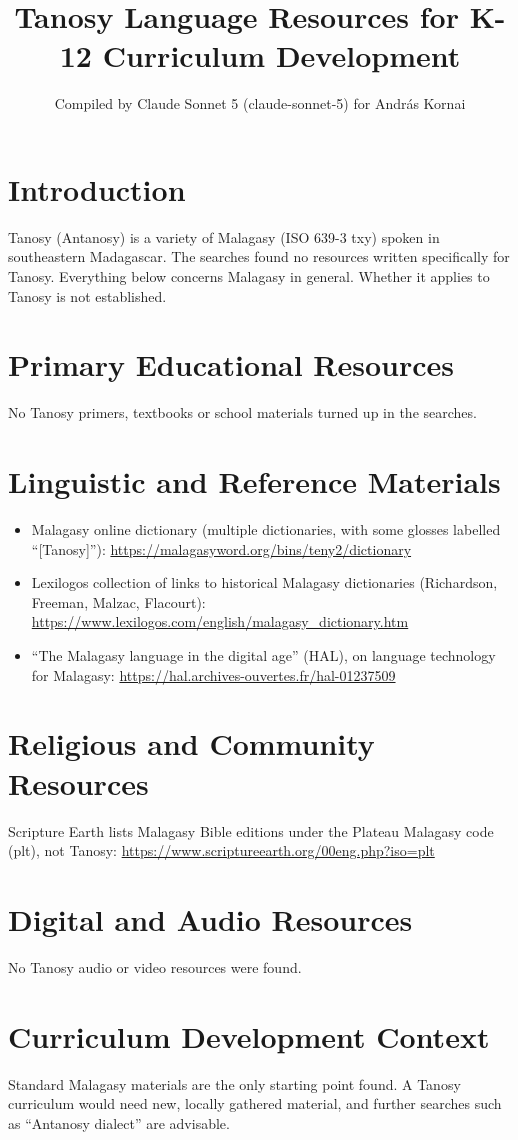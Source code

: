 \documentclass[12pt]{article}
\title{Tanosy Language Resources for K-12 Curriculum Development}
\author{Compiled by Claude Sonnet 5 (claude-sonnet-5) for Andr\'as Kornai}
\date{}
\begin{document}
\maketitle

\section{Introduction}
Tanosy (Antanosy) is a variety of Malagasy (ISO 639-3 txy) spoken in southeastern Madagascar. The searches found no resources written specifically for Tanosy. Everything below concerns Malagasy in general. Whether it applies to Tanosy is not established.

\section{Primary Educational Resources}
No Tanosy primers, textbooks or school materials turned up in the searches.

\section{Linguistic and Reference Materials}
\begin{itemize}
\item Malagasy online dictionary (multiple dictionaries, with some glosses labelled ``[Tanosy]''): \url{https://malagasyword.org/bins/teny2/dictionary}
\item Lexilogos collection of links to historical Malagasy dictionaries (Richardson, Freeman, Malzac, Flacourt): \url{https://www.lexilogos.com/english/malagasy_dictionary.htm}
\item ``The Malagasy language in the digital age'' (HAL), on language technology for Malagasy: \url{https://hal.archives-ouvertes.fr/hal-01237509}
\end{itemize}

\section{Religious and Community Resources}
Scripture Earth lists Malagasy Bible editions under the Plateau Malagasy code (plt), not Tanosy: \url{https://www.scriptureearth.org/00eng.php?iso=plt}

\section{Digital and Audio Resources}
No Tanosy audio or video resources were found.

\section{Curriculum Development Context}
Standard Malagasy materials are the only starting point found. A Tanosy curriculum would need new, locally gathered material, and further searches such as ``Antanosy dialect'' are advisable.
\end{document}
